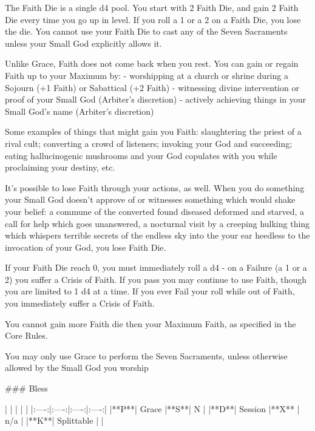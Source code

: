 The Faith Die is a single d4 {pool}.  You start with 2 Faith Die, and gain 2 Faith Die every time you go up in level.  If you roll a 1 or a 2 on a Faith Die, you lose the die.  You cannot use your Faith Die to cast any of the Seven Sacraments unless your Small God explicitly allows it.

Unlike Grace, Faith does not come back when you rest.  You can gain or regain Faith up to your Maximum by:
- worshipping at a church or shrine during a Sojourn (+1 Faith) or Sabattical (+2 Faith)
- witnessing divine intervention or proof of your Small God (Arbiter's discretion)
- actively achieving things in your Small God's name (Arbiter's discretion)

Some examples of things that might gain you Faith: slaughtering the priest of a rival cult; converting a crowd of listeners; invoking your God and succeeding; eating hallucinogenic mushrooms and your God copulates with you while proclaiming your destiny, etc.

It's possible to lose Faith through your actions, as well.  When you do something your Small God doesn't approve of or witnesses something which would shake your belief: a commune of the converted found diseased deformed and starved, a call for help which goes unanswered, a nocturnal visit by a creeping hulking thing which whispers terrible secrets of the endless sky into the your ear heedless to the invocation of your God, you lose Faith Die.

If your Faith Die reach 0, you must immediately roll a d4 - on a Failure (a 1 or a 2) you suffer a Crisis of Faith.  If you pass you may continue to use Faith, though you are limited to 1 d4 at a time.  If you ever Fail your roll while out of Faith, you immediately suffer a Crisis of Faith. 

You cannot gain more Faith die then your Maximum Faith, as specified in the Core Rules.









You may only use Grace to perform the Seven Sacraments, unless otherwise allowed by the Small God you worship






### Bless

| | | | |
|:----:|:----:|:----:|:----:|
|**P**| Grace |**S**|  N |
|**D**| Session |**X** |  n/a  |
|**K**| Splittable | |


